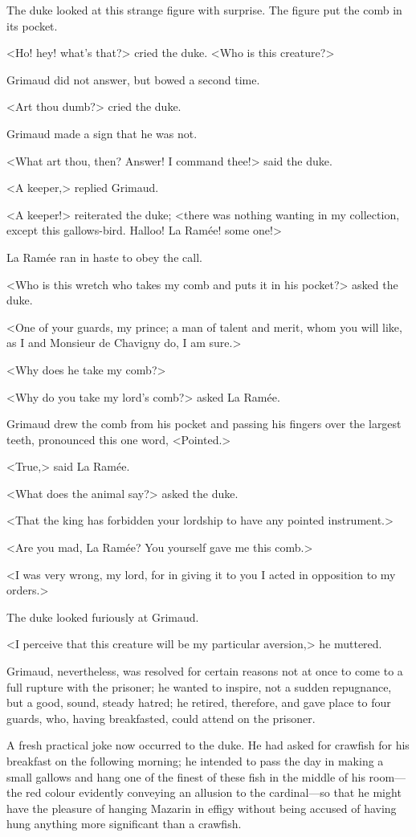 The duke looked at this strange figure with surprise. The figure put the comb in its pocket.

<Ho! hey! what's that?> cried the duke. <Who is this creature?>

Grimaud did not answer, but bowed a second time.

<Art thou dumb?> cried the duke.

Grimaud made a sign that he was not.

<What art thou, then? Answer! I command thee!> said the duke.

<A keeper,> replied Grimaud.

<A keeper!> reiterated the duke; <there was nothing wanting in my collection, except this gallows-bird. Halloo! La Ramée! some one!>

La Ramée ran in haste to obey the call.

<Who is this wretch who takes my comb and puts it in his pocket?> asked the duke.

<One of your guards, my prince; a man of talent and merit, whom you will like, as I and Monsieur de Chavigny do, I am sure.>

<Why does he take my comb?>

<Why do you take my lord's comb?> asked La Ramée.

Grimaud drew the comb from his pocket and passing his fingers over the largest teeth, pronounced this one word, <Pointed.>

<True,> said La Ramée.

<What does the animal say?> asked the duke.

<That the king has forbidden your lordship to have any pointed instrument.>

<Are you mad, La Ramée? You yourself gave me this comb.>

<I was very wrong, my lord, for in giving it to you I acted in opposition to my orders.>

The duke looked furiously at Grimaud.

<I perceive that this creature will be my particular aversion,> he muttered.

Grimaud, nevertheless, was resolved for certain reasons not at once to come to a full rupture with the prisoner; he wanted to inspire, not a sudden repugnance, but a good, sound, steady hatred; he retired, therefore, and gave place to four guards, who, having breakfasted, could attend on the prisoner.

A fresh practical joke now occurred to the duke. He had asked for crawfish for his breakfast on the following morning; he intended to pass the day in making a small gallows and hang one of the finest of these fish in the middle of his room—the red colour evidently conveying an allusion to the cardinal—so that he might have the pleasure of hanging Mazarin in effigy without being accused of having hung anything more significant than a crawfish.

